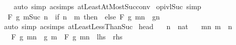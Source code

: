 \begin{isabellebody}
%
\isadelimproof
\ \ %
\endisadelimproof
%
\isatagproof
{}\isamarkupfalse%
\ {\isacharparenleft}{\kern0pt}auto\ simp{\isacharcolon}{\kern0pt}\ ac{\isacharunderscore}{\kern0pt}simps\ atLeastAtMostSuc{\isacharunderscore}{\kern0pt}conv{\isacharparenright}{\kern0pt}%
\endisatagproof
{\isafoldproof}%
%
\isadelimproof
\isanewline
%
\endisadelimproof
\isanewline
{}\isamarkupfalse%
\ op{\isacharunderscore}{\kern0pt}ivl{\isacharunderscore}{\kern0pt}Suc\ {\isacharbrackleft}{\kern0pt}simp{\isacharbrackright}{\kern0pt}{\isacharcolon}{\kern0pt}\isanewline
\ \ {\isachardoublequoteopen}F\ g\ {\isacharbraceleft}{\kern0pt}m{\isachardot}{\kern0pt}{\isachardot}{\kern0pt}{\isacharless}{\kern0pt}Suc\ n{\isacharbraceright}{\kern0pt}\ {\isacharequal}{\kern0pt}\ {\isacharparenleft}{\kern0pt}if\ n\ {\isacharless}{\kern0pt}\ m\ then\ \ else\ F\ g\ {\isacharbraceleft}{\kern0pt}m{\isachardot}{\kern0pt}{\isachardot}{\kern0pt}{\isacharless}{\kern0pt}n{\isacharbraceright}{\kern0pt}\ \isactrlbold {\isacharasterisk}{\kern0pt}\ g{\isacharparenleft}{\kern0pt}n{\isacharparenright}{\kern0pt}{\isacharparenright}{\kern0pt}{\isachardoublequoteclose}\isanewline
%
\isadelimproof
\ \ %
\endisadelimproof
%
\isatagproof
{}\isamarkupfalse%
\ {\isacharparenleft}{\kern0pt}auto\ simp{\isacharcolon}{\kern0pt}\ ac{\isacharunderscore}{\kern0pt}simps\ atLeastLessThanSuc{\isacharparenright}{\kern0pt}%
\endisatagproof
{\isafoldproof}%
%
\isadelimproof
\isanewline
%
\endisadelimproof
\isanewline
{}\isamarkupfalse%
\ head{\isacharcolon}{\kern0pt}\isanewline
\ \ \ n\ {\isacharcolon}{\kern0pt}{\isacharcolon}{\kern0pt}\ nat\isanewline
\ \ \ mn{\isacharcolon}{\kern0pt}\ {\isachardoublequoteopen}m\ {\isasymle}\ n{\isachardoublequoteclose}\isanewline
\ \ \ {\isachardoublequoteopen}F\ g\ {\isacharbraceleft}{\kern0pt}m{\isachardot}{\kern0pt}{\isachardot}{\kern0pt}n{\isacharbraceright}{\kern0pt}\ {\isacharequal}{\kern0pt}\ g\ m\ \isactrlbold {\isacharasterisk}{\kern0pt}\ F\ g\ {\isacharbraceleft}{\kern0pt}m{\isacharless}{\kern0pt}{\isachardot}{\kern0pt}{\isachardot}{\kern0pt}n{\isacharbraceright}{\kern0pt}{\isachardoublequoteclose}\ {\isacharparenleft}{\kern0pt}\ {\isachardoublequoteopen}{\isacharquery}{\kern0pt}lhs\ {\isacharequal}{\kern0pt}\ {\isacharquery}{\kern0pt}rhs{\isachardoublequoteclose}{\isacharparenright}{\kern0pt}\isanewline
%
\isadelimproof
%
\endisadelimproof
%
\isatagproof
{}\isamarkupfalse%
\ {\isacharminus}{\kern0pt}\isanewline
\ \ \isamarkupfalse%

\end{isabellebody}
